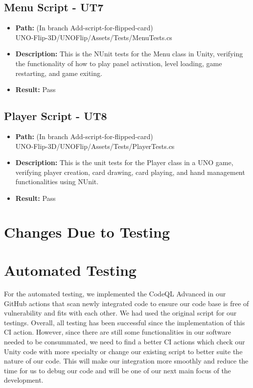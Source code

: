 \documentclass[12pt, titlepage]{article}
\begin{document}
\subsection{Menu Script - UT7}
\begin{itemize}
    \item \textbf{Path:} (In branch Add-script-for-flipped-card) \\ UNO-Flip-3D/UNOFlip/Assets/Tests/MenuTests.cs
    \item \textbf{Description:} This is the NUnit tests for the Menu class in Unity, verifying the functionality of how to play panel activation, level loading, game restarting, and game exiting.
    \item \textbf{Result:} Pass
\end{itemize}

\subsection{Player Script - UT8}
\begin{itemize}
    \item \textbf{Path:} (In branch Add-script-for-flipped-card) \\ UNO-Flip-3D/UNOFlip/Assets/Tests/PlayerTests.cs
    \item \textbf{Description:} This is the unit tests for the Player class in a UNO game, verifying player creation, card drawing, card playing, and hand management functionalities using NUnit.
    \item \textbf{Result:} Pass
\end{itemize}


\section{Changes Due to Testing}

\section{Automated Testing}
For the automated testing, we implemented the CodeQL Advanced in our GitHub actions that scan newly integrated code to ensure our code base is free of vulnerability and fits with each other. We had used the original script for our testings. Overall, all testing has been successful since the implementation of this CI action. However, since there are still some functionalities in our software needed to be consummated, we need to find a better CI actions which check our Unity code with more specialty or change our existing script to better suite the nature of our code. This will make our integration more smoothly and reduce the time for us to debug our code and will be one of our next main focus of the development.
\end{document}
